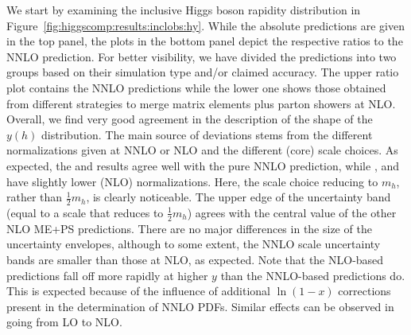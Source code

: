 We start by examining the inclusive Higgs boson rapidity distribution in
Figure~\ref{fig:higgscomp:results:inclobs:hy}. While the absolute
predictions are given in the top panel, the plots in the bottom panel
depict the respective ratios to the NNLO prediction. For better
visibility, we have divided the predictions into two groups based on
their simulation type and/or claimed accuracy. The upper ratio plot
contains the NNLO predictions while the lower one shows those obtained
from different strategies to merge matrix elements plus parton showers
at NLO. Overall, we find very good agreement in the description of the
shape of the $y(h)$ distribution. The main source of deviations stems
from the different normalizations given at NNLO or NLO and the
different (core) scale choices. As expected, the \Sherpa \NNLOPS and
\Powheg \NNLOPS results agree well with the pure NNLO prediction,
while \MGaMC, \Sherpa and \Herwig have slightly lower (NLO)
normalizations.  Here, the \MGaMC scale choice reducing to
$m_h$, rather than $\tfrac{1}{2}m_h$, is clearly noticeable. The upper edge of
the \MGaMC uncertainty band (equal to a scale that reduces to $\tfrac{1}{2}m_h$)
agrees with the central value of the other NLO ME+PS
predictions. There are no major differences in the size of the
uncertainty envelopes, although to some extent, the NNLO scale
uncertainty bands are smaller than those at NLO, as expected. Note
that the NLO-based predictions fall off more rapidly at higher $y$
than the NNLO-based predictions do. This is expected because of the
influence of additional $\ln(1-x)$ corrections present in the
determination of NNLO PDFs. Similar effects can be observed in going
from LO to NLO.


